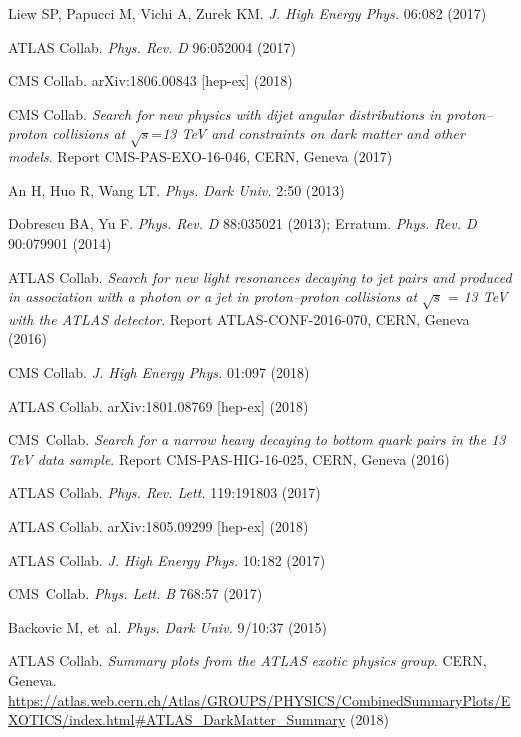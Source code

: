 \documentclass{ar-1col}
\begin{document}
\begin{thebibliography}{175}
Liew SP, Papucci M, Vichi A, Zurek KM. \textit{J. High Energy Phys.} 06:082 (2017)

{ATLAS Collab}. \textit{Phys. Rev.} \textit{D} 96:052004 (2017)
  
{CMS Collab.} arXiv:1806.00843 [hep-ex] (2018) 

CMS Collab.\textit{ Search for new physics with dijet angular distributions in proton--proton collisions at} $\sqrt{s}$=\textit{13 TeV and constraints on dark matter and other models}. Report CMS-PAS-EXO-16-046, CERN, Geneva (2017)

An H, Huo R, Wang LT. \textit{Phys. Dark Univ.} 2:50 (2013)

Dobrescu BA, Yu F. \textit{Phys. Rev.} \textit{D} 88:035021 (2013); Erratum. \textit{Phys. Rev. D} 90:079901 (2014)

{ATLAS Collab}. \textit{Search for new light resonances decaying to jet pairs and produced in association with a photon or a jet in proton--proton collisions at}
$\sqrt{s}$ = \textit{13 TeV with the ATLAS detector}. Report ATLAS-CONF-2016-070, CERN, Geneva (2016)

{CMS Collab}. \textit{J. High Energy Phys.} 01:097 (2018) 

{ATLAS Collab}. arXiv:1801.08769 [hep-ex] (2018)

{CMS~Collab}. \textit{Search for a narrow heavy decaying to bottom quark pairs in the 13 TeV data sample}.
Report {CMS-PAS-HIG-16-025}, CERN, Geneva (2016)

{ATLAS Collab}. \textit{Phys. Rev. Lett.} 119:191803 (2017)

{ATLAS Collab.} arXiv:1805.09299 [hep-ex] (2018)

{ATLAS Collab}. \textit{J. High Energy Phys.} 10:182 (2017)

{CMS~Collab}. \textit{Phys. Lett.} \textit{B} 768:57 (2017)

Backovic M, et~al. \textit{Phys. Dark Univ.} 9/10:37 (2015)

ATLAS Collab. \textit{Summary plots from the ATLAS exotic
physics group}. CERN, Geneva. \url{https://atlas.web.cern.ch/Atlas/GROUPS/PHYSICS/CombinedSummaryPlots/EXOTICS/index.html#ATLAS_DarkMatter_Summary} (2018)


\end{thebibliography}
\end{document}
